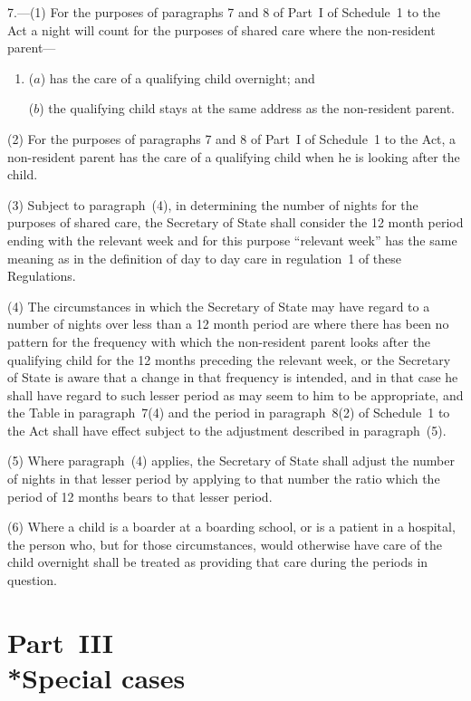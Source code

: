 \documentclass[12pt,a4paper]{article}
\begin{document}
7.---(1)  For the purposes of paragraphs 7 and 8 of Part~I of Schedule~1 to the Act a night will count for the purposes of shared care where the non-resident parent—
\begin{enumerate}\item[]
($a$) has the care of a qualifying child overnight; and

($b$) the qualifying child stays at the same address as the non-resident parent.
\end{enumerate}

(2) For the purposes of paragraphs 7 and 8 of Part~I of Schedule~1 to the Act, a non-resident parent has the care of a qualifying child when he is looking after the child.

(3) Subject to paragraph~(4), in determining the number of nights for the purposes of shared care, the Secretary of State shall consider the 12 month period ending with the relevant week and for this purpose “relevant week” has the same meaning as in the definition of day to day care in regulation~1 of these Regulations.

(4) The circumstances in which the Secretary of State may have regard to a number of nights over less than a 12 month period are where there has been no pattern for the frequency with which the non-resident parent looks after the qualifying child for the 12 months preceding the relevant week, or the Secretary of State is aware that a change in that frequency is intended, and in that case he shall have regard to such lesser period as may seem to him to be appropriate, and the Table in paragraph~7(4) and the period in paragraph~8(2) of Schedule~1 to the Act shall have effect subject to the adjustment described in paragraph~(5).

(5) Where paragraph~(4) applies, the Secretary of State shall adjust the number of nights in that lesser period by applying to that number the ratio which the period of 12 months bears to that lesser period.

(6) Where a child is a boarder at a boarding school, or is a patient in a hospital, the person who, but for those circumstances, would otherwise have care of the child overnight shall be treated as providing that care during the periods in question.

\section[Part~III --- Special cases]{Part~III\\*Special cases}
\end{document}
